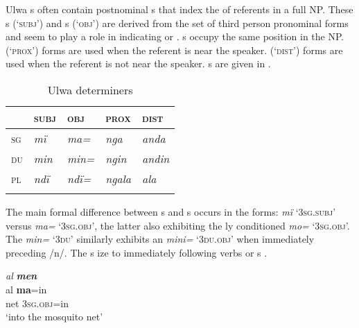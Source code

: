 
Ulwa s often contain postnominal s that index the  of referents in a full NP. These s (‘{\textsc{subj}}{’) and s (‘}{\textsc{obj}}{’) are derived from the set of third person pronominal forms and seem to play a role in indicating  or .  s occupy the same position in the NP.  (‘}{\textsc{prox}}{’) forms are used when the referent is near the speaker.  (‘}{\textsc{dist}}{’) forms are used when the referent is not near the speaker. s are given in .}

\begin{table}
\caption{Ulwa determiners}
\label{tab:overview:4}
\begin{tabular}{lllll}
\lsptoprule
& {\scshape subj} & {\scshape obj} & {\scshape prox} & {\scshape dist}\\
\midrule
\textsc{sg} & {\itshape mï} & {\itshape ma=} & {\itshape nga} & {\itshape anda}\\
\textsc{du} & {\itshape min} & {\itshape min=} & {\itshape ngin} & {\itshape andin}\\
{\scshape pl} & {\itshape ndï} & {\itshape ndï=} & {\itshape ngala} & {\itshape ala}\\
\lspbottomrule
\end{tabular}
\end{table}


The main formal difference between s and s occurs in the  forms: \textit{mï} ‘3\textsc{sg.subj}’ versus \textit{ma=} ‘3\textsc{sg.obj}’, the latter also exhibiting the ly conditioned  \textit{mo=} ‘3\textsc{sg.obj}’. The   \textit{min=} ‘3\textsc{du}’ similarly exhibits an  \textit{mini=} ‘\textsc{3du.obj’} when immediately preceding /n/. The s ize to immediately following verbs or s .


\ea\label{ex:overview:44}
 \textit{al} \textbf{\textit{men}}\\
\gll    al \textbf{ma}=in\\
    net  3\textsc{sg.obj}{=in}\\
\glt    ‘into the mosquito net’
\z

